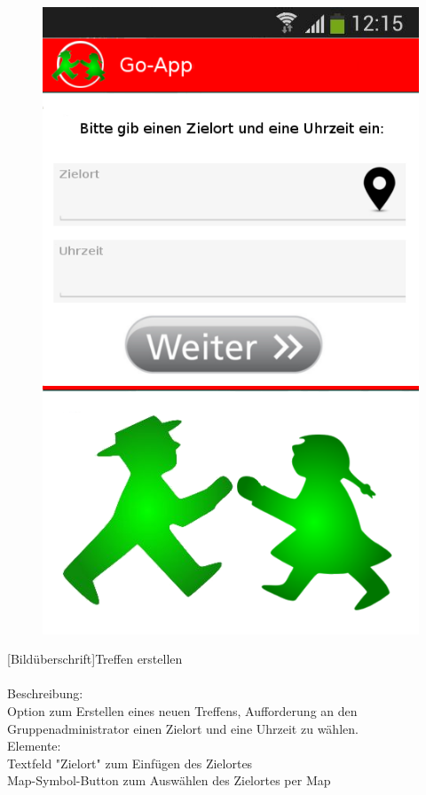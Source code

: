 \begin{figure} 
	\includegraphics[scale =1]{resources/images/treffpunkt_erstellen.png}
\end{figure}
[Bildüberschrift]Treffen erstellen \\ \\
[Kleinüberschrift]Beschreibung:\\
Option zum Erstellen eines neuen Treffens, Aufforderung an den Gruppenadministrator einen Zielort und eine Uhrzeit zu wählen.\\
[Kleinüberschrift]Elemente:\\
Textfeld "Zielort" zum Einfügen des Zielortes\\
Map-Symbol-Button zum Auswählen des Zielortes per Map\\
